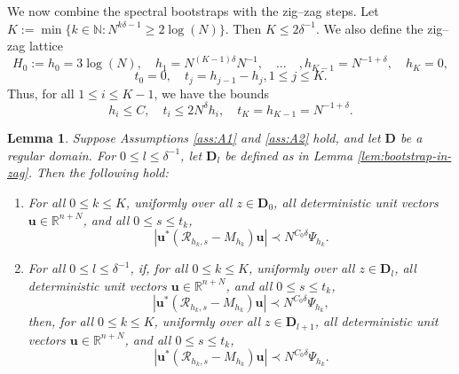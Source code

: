 \documentclass[11pt,reqno]{amsart}
\def\R{\mathbb{R}}
\def\u{\mathbf{u}}
\def\N{\mathbb{N}}
\def\cR{\mathcal{R}}
\def\bD{\mathbf{D}}
\newtheorem{lemma}[theorem]{Lemma}
\theoremstyle{definition}
\numberwithin{equation}{section}
\numberwithin{figure}{section}
\begin{document}
We now combine the spectral bootstraps with the zig--zag steps. Let $K:=\min\{k\in\N:N^{k\delta-1}\geq 2\log(N)\}$. Then $K\leq 2\delta^{-1}$. We also define the zig--zag lattice
\[
    H_0:=h_0=3\log(N),\quad h_1=N^{(K-1)\delta}N^{-1},\quad ...\quad , h_{K-1}=N^{-1+\delta},\quad h_K=0,
\]
\[
    t_0=0,\quad t_j=h_{j-1}-h_j,1\leq j\leq K.
\]
Thus, for all $1\leq i\leq K-1$, we have the bounds
\[
    h_i\leq C,\quad t_i\leq 2N^\delta h_i,\quad t_K=h_{K-1}=N^{-1+\delta}.
\]
\begin{lemma}\label{lem:zig-zag-and-bootstraps}
Suppose Assumptions \ref{ass:A1} and \ref{ass:A2} hold, and let $\bD$ be a regular domain. For $0\leq l\leq \delta^{-1}$, let $\bD_l$ be defined as in Lemma \ref{lem:bootstrap-in-zag}. Then the following hold:
\begin{enumerate}[label=(\alph*)]
    \item For all $0\leq k\leq K$, uniformly over all $z\in\bD_0$, all deterministic unit vectors $\u\in\R^{n+N}$, and all $0\leq s\leq t_k$,
    \[
        |\u^*(\cR_{h_k,s}-M_{h_k})\u|\prec N^{C_0\delta}\Psi_{h_k}.
    \]
    \item For all $0\leq l\leq \delta^{-1}$, if, for all $0\leq k\leq K$, uniformly over all $z\in\bD_l$, all deterministic unit vectors $\u\in\R^{n+N}$, and all $0\leq s\leq t_k$,
    \[
        |\u^*(\cR_{h_k,s}-M_{h_k})\u|\prec N^{C_0\delta}\Psi_{h_k},
    \]
    then, for all $0\leq k\leq K$, uniformly over all $z\in\bD_{l+1}$, all deterministic unit vectors $\u\in\R^{n+N}$, and all $0\leq s\leq t_k$,
    \[
        |\u^*(\cR_{h_k,s}-M_{h_k})\u|\prec N^{C_0\delta}\Psi_{h_k}.
    \]
\end{enumerate}
\end{lemma}
\end{document}
